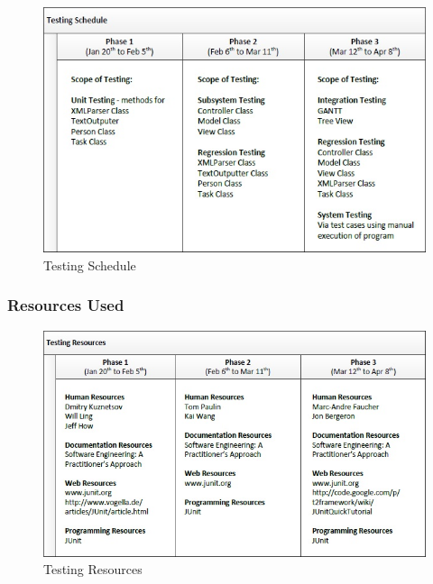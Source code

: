\documentclass[12pt]{article}
\begin{document}
\begin{figure}[htbp]

\begin{center} \includegraphics[scale=1]{Schedule.jpg} \end{center}
\label{fig:testing-schedule}
\caption{Testing Schedule}

\end{figure}

\subsubsection{Resources Used}

\begin{figure}[htbp]

\begin{center} \includegraphics[scale=1]{Resources.jpg} \end{center}
\label{fig:testing-resources}
\caption{Testing Resources}

\end{figure}
\end{document}
